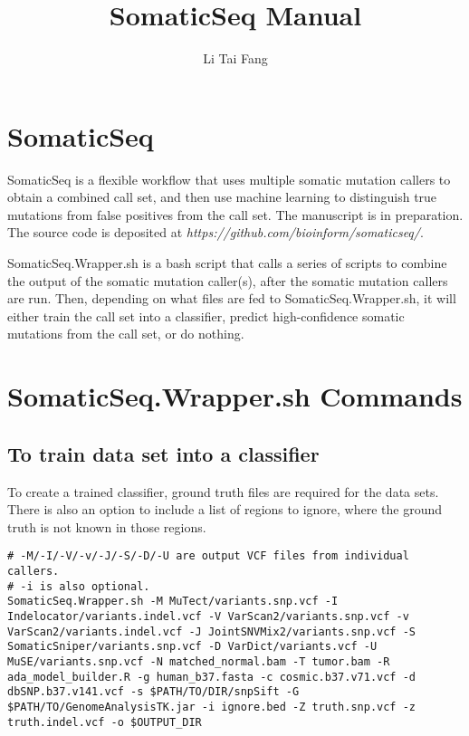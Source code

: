 \documentclass[10pt,letterpaper]{article}
\author{Li Tai Fang}
\title{SomaticSeq Manual}
\begin{document}
\maketitle




\section{SomaticSeq}

SomaticSeq is a flexible workflow that uses multiple somatic mutation callers to obtain a combined call set, and then use machine learning to distinguish true mutations from false positives from the call set. The manuscript is in preparation. The source code is deposited at \textit{https://github.com/bioinform/somaticseq/}. 

SomaticSeq.Wrapper.sh is a bash script that calls a series of scripts to combine the output of the somatic mutation caller(s), after the somatic mutation callers are run. Then, depending on what files are fed to SomaticSeq.Wrapper.sh, it will either train the call set into a classifier, predict high-confidence somatic mutations from the call set, or do nothing. 



\section{SomaticSeq.Wrapper.sh Commands}

\subsection{To train data set into a classifier}

To create a trained classifier, ground truth files are required for the data sets. There is also an option to include a list of regions to ignore, where the ground truth is not known in those regions. 

\begin{lstlisting}
# -M/-I/-V/-v/-J/-S/-D/-U are output VCF files from individual callers.
# -i is also optional.
SomaticSeq.Wrapper.sh -M MuTect/variants.snp.vcf -I Indelocator/variants.indel.vcf -V VarScan2/variants.snp.vcf -v VarScan2/variants.indel.vcf -J JointSNVMix2/variants.snp.vcf -S SomaticSniper/variants.snp.vcf -D VarDict/variants.vcf -U MuSE/variants.snp.vcf -N matched_normal.bam -T tumor.bam -R ada_model_builder.R -g human_b37.fasta -c cosmic.b37.v71.vcf -d dbSNP.b37.v141.vcf -s $PATH/TO/DIR/snpSift -G $PATH/TO/GenomeAnalysisTK.jar -i ignore.bed -Z truth.snp.vcf -z truth.indel.vcf -o $OUTPUT_DIR
\end{lstlisting}
\end{document}
